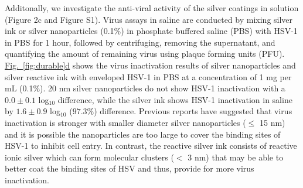 \documentclass[journal=jacsat,manuscript=article]{achemso}
\newcommand{\figref}[2][]{\hyperref[#2]{Fig.~\ref{#2}#1}}
\begin{document}
Additonally, we investigate the anti-viral activity of the silver coatings in solution (Figure 2c and Figure S1). 
Virus assays in saline are conducted by mixing silver ink or silver nanoparticles (0.1\%) in phosphate buffered saline (PBS) with HSV-1 in PBS for 1 hour, followed by centrifuging, removing the supernatant, and quantifying the amount of remaining virus using plaque forming units (PFU). 
\figref[d]{fig:durable} shows the virus inactivation results of silver nanoparticles and  silver reactive ink
with enveloped HSV-1 in PBS at a concentration of 1 mg per mL (0.1\%). 
20 nm silver nanoparticles do not show HSV-1 inactivation with a $0.0 \pm 0.1$ log$_{10}$ difference, while the silver ink shows HSV-1 inactivation in saline by $1.6 \pm 0.9$ log$_{10}$ ($97.3 %
\%$) difference. 
Previous reports have suggested that virus inactivation is stronger with smaller diameter silver nanoparticles ($\leq$ 15 nm) and it is possible the nanoparticles are too large to cover the binding sites of HSV-1 to inhibit cell entry.\cite{jeremiah_potent_2020}
In contrast, the reactive silver ink %
consists of reactive ionic silver which can form molecular clusters ($<$ 3 nm) that may be able to better coat the binding sites of HSV and thus, provide for more virus inactivation. %
\end{document}
